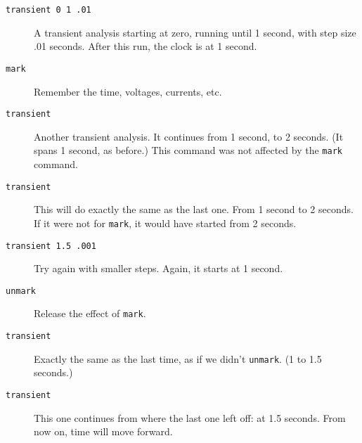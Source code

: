 \begin{description}
\item[{\tt transient 0 1 .01}] A transient analysis starting at zero,
running until 1 second, with step size .01 seconds.  After this run, the
clock is at 1 second.

\item[{\tt mark}] Remember the time, voltages, currents, etc.

\item[{\tt transient}] Another transient analysis.  It continues from 1
second, to 2 seconds.  (It spans 1 second, as before.)  This command was not
affected by the {\tt mark} command.

\item[{\tt transient}] This will do exactly the same as the last one.  From
1 second to 2 seconds.  If it were not for {\tt mark}, it would have started
from 2 seconds.

\item[{\tt transient 1.5 .001}] Try again with smaller steps.  Again, it
starts at 1 second.

\item[{\tt unmark}] Release the effect of {\tt mark}.

\item[{\tt transient}] Exactly the same as the last time, as if we didn't
{\tt unmark}.  (1 to 1.5 seconds.)

\item[{\tt transient}] This one continues from where the last one left off:
at 1.5 seconds.  From now on, time will move forward.

\end{description}
